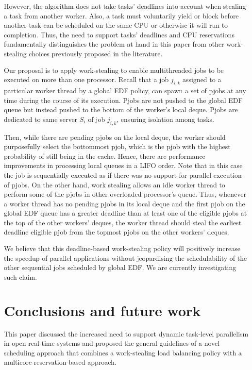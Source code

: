 \documentclass[10pt,twocolumn]{article}
\begin{document}
However, the algorithm does not take tasks' deadlines into account when stealing a task from another worker. Also, a task must voluntarily yield or block before another task can be scheduled on the same CPU or otherwise it will run to completion. Thus, the need to support tasks' deadlines and CPU reservations fundamentally distinguishes the problem at hand in this paper from other work-stealing choices previously proposed in the literature.

Our proposal is to apply work-stealing to enable multithreaded jobs to be executed on more than one processor. Recall that a job $j_{i,k}$ assigned to a particular worker thread by a global EDF policy, can spawn a set of pjobs at any time during the course of its execution. Pjobs are not pushed to the global EDF queue but instead pushed to the bottom of the worker's local deque. Pjobs are dedicated to same server $S_i$ of job $j_{i,k}$, ensuring isolation among tasks. 

Then, while there are pending pjobs on the local deque, the worker should purposefully select the bottommost pjob, which is the pjob with the highest probability of still being in the cache. Hence, there are performance improvements in processing local queues in a LIFO order. Note that in this case the job is sequentially executed as if there was no support for parallel execution of pjobs. On the other hand, work stealing allows an idle worker thread to perform some of the pjobs in other overloaded processor's queue. Thus, whenever a worker thread has no pending pjobs in its local deque and the first pjob on the global EDF queue has a greater deadline than at least one of the eligible pjobs at the top of the other workers' deques, the worker thread should steal the earliest deadline eligible pjob from the topmost pjobs on the other workers' deques. 

We believe that this deadline-based work-stealing policy will positively increase the speedup of parallel applications without jeopardising the schedulability of the other sequential jobs scheduled by global EDF. We are currently investigating such claim. 

\section{Conclusions and future work}

This paper discussed the increased need to support dynamic task-level parallelism in open real-time systems and proposed the general guidelines of a novel scheduling approach that combines a work-stealing load balancing policy with a multicore reservation-based approach.  
\end{document}
